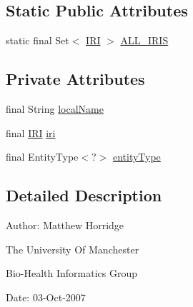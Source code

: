 \subsection*{Static Public Attributes}
\begin{DoxyCompactItemize}
\item 
static final Set$<$ \hyperlink{classorg_1_1semanticweb_1_1owlapi_1_1model_1_1_i_r_i}{I\-R\-I} $>$ \hyperlink{enumorg_1_1semanticweb_1_1owlapi_1_1vocab_1_1_s_k_o_s_vocabulary_a74414b7170a2eae643ae0a38c15d790d}{A\-L\-L\-\_\-\-I\-R\-I\-S}
\end{DoxyCompactItemize}
\subsection*{Private Attributes}
\begin{DoxyCompactItemize}
\item 
final String \hyperlink{enumorg_1_1semanticweb_1_1owlapi_1_1vocab_1_1_s_k_o_s_vocabulary_ad1972c635517a7c20608ba0fa7519f5d}{local\-Name}
\item 
final \hyperlink{classorg_1_1semanticweb_1_1owlapi_1_1model_1_1_i_r_i}{I\-R\-I} \hyperlink{enumorg_1_1semanticweb_1_1owlapi_1_1vocab_1_1_s_k_o_s_vocabulary_a23887c7d53f4e357ef83db6fa18cedcc}{iri}
\item 
final Entity\-Type$<$?$>$ \hyperlink{enumorg_1_1semanticweb_1_1owlapi_1_1vocab_1_1_s_k_o_s_vocabulary_a94213c33824b92739adb968600ab7d3a}{entity\-Type}
\end{DoxyCompactItemize}


\subsection{Detailed Description}
Author\-: Matthew Horridge\par
 The University Of Manchester\par
 Bio-\/\-Health Informatics Group\par
 Date\-: 03-\/\-Oct-\/2007\par
\par
 

